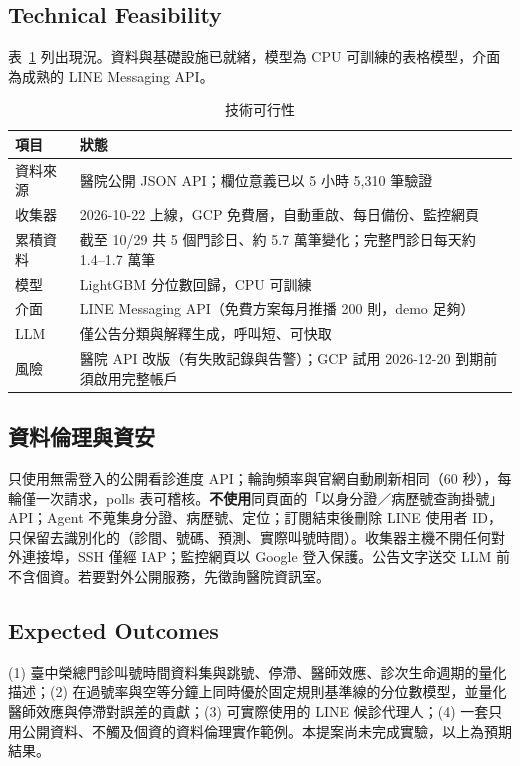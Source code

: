 \documentclass[11pt,twocolumn]{article}
\begin{document}
\subsection{Technical Feasibility}
表~\ref{tab:feas} 列出現況。資料與基礎設施已就緒，模型為 CPU 可訓練的表格模型，介面為成熟的 LINE Messaging API。
\begin{table}[!htb]
\centering\linespread{1.0}\selectfont\small
\caption{技術可行性}
\label{tab:feas}
\begin{tabularx}{\columnwidth}{@{}>{\raggedright\arraybackslash}p{1.9cm}X@{}}
\toprule
項目 & 狀態\\
\midrule
資料來源 & 醫院公開 JSON API；欄位意義已以 5 小時 5,310 筆驗證\\
收集器 & 2026-10-22 上線，GCP 免費層，自動重啟、每日備份、監控網頁\\
累積資料 & 截至 10/29 共 5 個門診日、約 5.7 萬筆變化；完整門診日每天約 1.4--1.7 萬筆\\
模型 & LightGBM 分位數回歸，CPU 可訓練\\
介面 & LINE Messaging API（免費方案每月推播 200 則，demo 足夠）\\
LLM & 僅公告分類與解釋生成，呼叫短、可快取\\
風險 & 醫院 API 改版（有失敗記錄與告警）；GCP 試用 2026-12-20 到期前須啟用完整帳戶\\
\bottomrule
\end{tabularx}
\end{table}

\subsection{資料倫理與資安}
只使用無需登入的公開看診進度 API；輪詢頻率與官網自動刷新相同（60 秒），每輪僅一次請求，polls 表可稽核。\textbf{不使用}同頁面的「以身分證／病歷號查詢掛號」API；Agent 不蒐集身分證、病歷號、定位；訂閱結束後刪除 LINE 使用者 ID，只保留去識別化的（診間、號碼、預測、實際叫號時間）。收集器主機不開任何對外連接埠，SSH 僅經 IAP；監控網頁以 Google 登入保護。公告文字送交 LLM 前不含個資。若要對外公開服務，先徵詢醫院資訊室。

\subsection{Expected Outcomes}
(1) 臺中榮總門診叫號時間資料集與跳號、停滯、醫師效應、診次生命週期的量化描述；(2) 在過號率與空等分鐘上同時優於固定規則基準線的分位數模型，並量化醫師效應與停滯對誤差的貢獻；(3) 可實際使用的 LINE 候診代理人；(4) 一套只用公開資料、不觸及個資的資料倫理實作範例。本提案尚未完成實驗，以上為預期結果。
\end{document}
